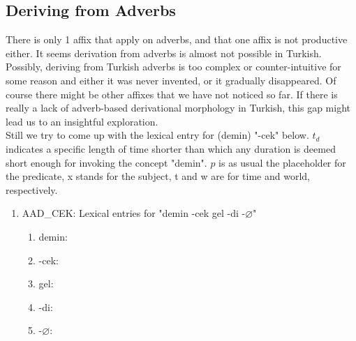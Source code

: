 \documentclass[11pt]{article} %
\begin{document}


\subsection{Deriving from Adverbs}

There is only 1 affix that apply on adverbs, and that one affix is not productive either. It seems derivation from adverbs is almost not possible in Turkish. Possibly, deriving from Turkish adverbs is too complex or counter-intuitive for some reason and either it was never invented, or it gradually disappeared. Of course there might be other affixes that we have not noticed so far. If there is really a lack of adverb-based derivational morphology in Turkish, this gap might lead us to an insightful exploration. \\

Still we try to come up with the lexical entry for (demin) "-cek" below. $t_d$ indicates a specific length of time shorter than which any duration is deemed short enough for invoking the concept "demin". $p$ is as usual the placeholder for the predicate, x stands for the subject, t and w are for time and world, respectively. \\ 


\begin{enumerate}[resume*]
	\item AAD\_CEK: Lexical entries for "demin -cek gel -di -$\varnothing$"
	\begin{enumerate}[label=(\alph*), ref=(\alph*)]\itemsep1pt
	\item demin: 
	\item -cek: 
	\item gel: 
	\item -di: 
	\item -$\varnothing$: 
	\end{enumerate}
\end{enumerate}
\end{document}
